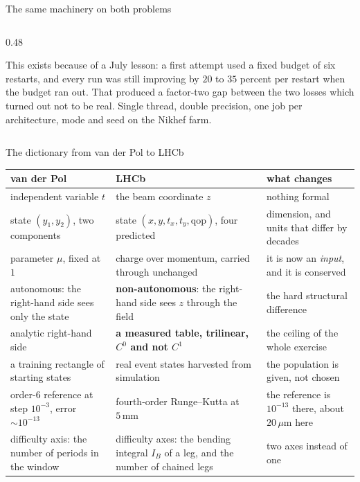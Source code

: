 \documentclass[aspectratio=169,10pt]{beamer}
\newcommand{\um}{\ensuremath{\,\mu\mathrm{m}}}
\newcommand{\mm}{\ensuremath{\,\mathrm{mm}}}
\newcommand{\qop}{\ensuremath{\mathrm{qop}}}
\newcommand{\bad}[1]{{\color{warm}\textbf{#1}}}
\begin{document}
\begin{frame}[shrink=25]{The same machinery on both problems}
\begin{columns}[T]
\begin{column}{0.48\textwidth}
\begin{enumerate}
      \end{enumerate}
      \smallskip
      {\small This exists because of a July lesson: a first attempt used a fixed
       budget of six restarts, and every run was still improving by $20$ to $35$
       percent per restart when the budget ran out. That produced a factor-two
       gap between the two losses which turned out not to be real.}
      \smallskip
      {\small Single thread, double precision, one job per architecture, mode
       and seed on the Nikhef farm.}
    \end{column}
  \end{columns}
\end{frame}

\begin{frame}[shrink=25]{The dictionary from van der Pol to LHCb}
  \vspace{2mm}
  \centering
  \small
  \begin{tabular}{@{}p{4.9cm}p{5.0cm}p{3.7cm}@{}}
    \toprule
    van der Pol & LHCb & what changes \\
    \midrule
    independent variable $t$ & the beam coordinate $z$ & nothing formal \\[3pt]
    state $(y_1, y_2)$, two components &
      state $(x, y, t_x, t_y, \qop)$, four predicted &
      dimension, and units that differ by decades \\[3pt]
    parameter $\mu$, fixed at $1$ &
      charge over momentum, carried through unchanged &
      it is now an \emph{input}, and it is conserved \\[3pt]
    autonomous: the right-hand side sees only the state &
      \bad{non-autonomous}: the right-hand side sees $z$ through the field &
      the hard structural difference \\[3pt]
    analytic right-hand side &
      \bad{a measured table, trilinear, $C^0$ and not $C^1$} &
      the ceiling of the whole exercise \\[3pt]
    a training rectangle of starting states &
      real event states harvested from simulation &
      the population is given, not chosen \\[3pt]
    order-6 reference at step $10^{-3}$, error $\sim 10^{-13}$ &
      fourth-order Runge--Kutta at $5\mm$ &
      the reference is $10^{-13}$ there, about $20\um$ here \\[3pt]
    difficulty axis: the number of periods in the window &
      difficulty axes: the bending integral $I_B$ of a leg, and the number of
      chained legs &
      two axes instead of one \\
    \bottomrule
  \end{tabular}
\end{frame}
\end{document}
